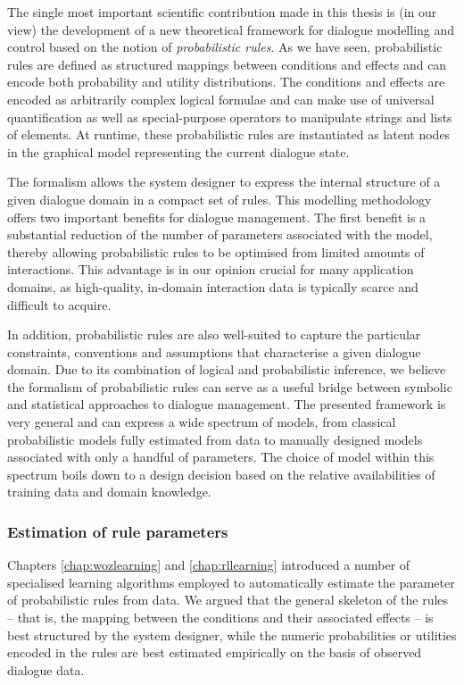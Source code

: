 The single most important scientific contribution made in this thesis is (in our view) the development of a new theoretical framework for dialogue modelling and control based on the notion of \textit{probabilistic rules}.  As we have seen, probabilistic rules are defined as structured mappings between conditions and effects and can encode both probability and utility distributions.  The conditions and effects are encoded as arbitrarily complex logical formulae and can make use of universal quantification as well as special-purpose operators to manipulate strings and lists of elements. At runtime, these probabilistic rules are instantiated as latent nodes in the graphical model representing the current dialogue state.  

The formalism allows the system designer to express the internal structure of a given dialogue domain in a compact set of rules. This modelling methodology offers two important benefits for dialogue management.  The first benefit is a substantial reduction of the number of parameters associated with the model, thereby allowing probabilistic rules to be optimised from limited amounts of interactions. This advantage is in our opinion crucial for many application domains, as high-quality, in-domain interaction data is typically scarce and difficult to acquire.

In addition, probabilistic rules are also well-suited to capture the particular constraints, conventions and assumptions that characterise a given dialogue domain.  Due to its combination of logical and probabilistic inference, we believe the formalism of probabilistic rules can serve as a useful bridge between symbolic and statistical approaches to dialogue management.  The presented framework is very general and can express a wide spectrum of models, from classical probabilistic models fully estimated from data to manually designed models associated with only a handful of parameters. The choice of model within this spectrum boils down to a design decision based on the relative availabilities of training data and domain knowledge.


\subsubsection*{Estimation of rule parameters}
Chapters \ref{chap:wozlearning} and \ref{chap:rllearning} introduced a number of specialised learning algorithms employed to automatically estimate the parameter of probabilistic rules from data. We argued that the general skeleton of the rules -- that is, the mapping between the conditions and their associated effects -- is best structured by the system designer, while the numeric probabilities or utilities encoded in the rules are best estimated empirically on the basis of observed dialogue data.  

